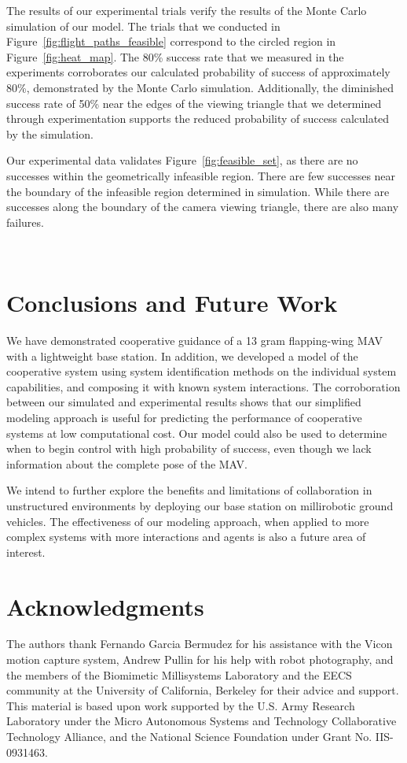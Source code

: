 \documentclass{aamas2013}
\begin{document}
The results of our experimental trials verify the results of the Monte Carlo
simulation of our model. The trials that we conducted in
Figure~\ref{fig:flight_paths_feasible} correspond to the circled region in
Figure~\ref{fig:heat_map}. The 80\% success rate that we measured in the
experiments corroborates our calculated probability of success of
approximately 80\%, demonstrated by the Monte Carlo simulation. Additionally,
the diminished success rate of 50\% near the edges of the viewing triangle
that we determined through experimentation supports the reduced probability of
success calculated by the simulation.

Our experimental data validates Figure~\ref{fig:feasible_set}, as there are 
no successes within the geometrically infeasible region. There are few 
successes near the boundary of the infeasible region determined in 
simulation. While there are successes along the boundary of the camera 
viewing triangle, there are also many failures.


~\section{Conclusions and Future Work}
We have demonstrated cooperative guidance of a 13 gram flapping-wing MAV with
a lightweight base station. In addition, we developed a model of
the cooperative system using system identification methods on the individual
system capabilities, and composing it with known system interactions. The
corroboration between our simulated and experimental results shows that our
simplified modeling approach is useful for predicting the performance of
cooperative systems at low computational cost. Our model could also be used to
determine when to begin control with high probability of success, even though
we lack information about the complete pose of the MAV.

We intend to further explore the benefits and limitations of collaboration in
unstructured environments by deploying our base station on millirobotic ground
vehicles. The effectiveness of our modeling
approach, when applied to more complex systems with more interactions and 
agents is also a future area of interest. 

\section{Acknowledgments}
The authors thank Fernando Garcia Bermudez for his 
assistance with the Vicon motion capture system, Andrew Pullin for his 
help with robot photography, and the members of the Biomimetic 
Millisystems Laboratory and the EECS community at the University of 
California, Berkeley for their advice and support. This material is based upon 
work supported by the U.S. Army Research Laboratory under the Micro Autonomous 
Systems and Technology Collaborative Technology Alliance, and the National 
Science Foundation under Grant No. IIS-0931463.
\end{document}

